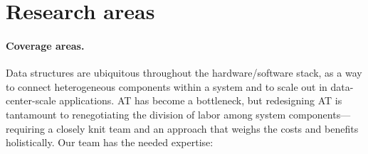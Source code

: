 \section{Research areas}




\paragraph{Coverage areas.} Data structures are ubiquitous throughout the
hardware/software stack, as a way to connect heterogeneous components within a
system and to scale out in data-center-scale applications.  AT has become a
bottleneck, but redesigning AT is tantamount to renegotiating the division of
labor among system components---requiring a closely knit team and an approach
that weighs the costs and benefits holistically.
Our team has the needed expertise:

